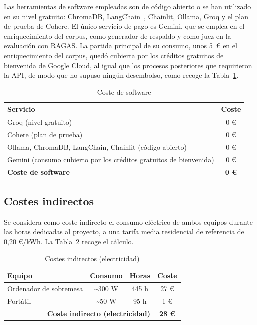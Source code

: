 \documentclass[11pt, a4paper]{report}
\begin{document}
	Las herramientas de software empleadas son de código abierto o se han utilizado en su nivel gratuito: ChromaDB, LangChain~\cite{langchain}, Chainlit, Ollama, Groq y el plan de prueba de Cohere. El único servicio de pago es Gemini, que se emplea en el enriquecimiento del corpus, como generador de respaldo y como juez en la evaluación con RAGAS. La partida principal de su consumo, unos 5~€ en el enriquecimiento del corpus, quedó cubierta por los créditos gratuitos de bienvenida de Google Cloud, al igual que los procesos posteriores que requirieron la API, de modo que no supuso ningún desembolso, como recoge la Tabla~\ref{tab:coste-software}.

	\begin{table}[H]
		\centering
		\begin{tabular}{|l|c|}
			\hline
			\rowcolor{tabla-header}
			\textbf{Servicio} & \textbf{Coste} \\
			\hline
			Groq (nivel gratuito) & 0 € \\
			\hline
			\rowcolor{fila-alterna}
			Cohere (plan de prueba) & 0 € \\
			\hline
			Ollama, ChromaDB, LangChain, Chainlit (código abierto) & 0 € \\
			\hline
			\rowcolor{fila-alterna}
			Gemini (consumo cubierto por los créditos gratuitos de bienvenida) & 0 € \\
			\hline
			\textbf{Coste de software} & \textbf{0 €} \\
			\hline
		\end{tabular}
		\caption{Coste de software}
		\label{tab:coste-software}
	\end{table}

	\subsection{Costes indirectos}

	Se considera como coste indirecto el consumo eléctrico de ambos equipos
	durante las horas dedicadas al proyecto, a una tarifa media residencial de
	referencia de 0,20 €/kWh. La Tabla~\ref{tab:coste-indirecto} recoge el cálculo.

	\begin{table}[H]
		\centering
		\begin{tabular}{|l|c|c|c|}
			\hline
			\rowcolor{tabla-header}
			\textbf{Equipo} & \textbf{Consumo} & \textbf{Horas} & \textbf{Coste} \\
			\hline
			Ordenador de sobremesa & \textasciitilde300 W & 445 h & 27 € \\
			\hline
			\rowcolor{fila-alterna}
			Portátil & \textasciitilde50 W & 95 h & 1 € \\
			\hline
			\multicolumn{3}{|r|}{\textbf{Coste indirecto (electricidad)}} & \textbf{28 €} \\
			\hline
		\end{tabular}
		\caption{Costes indirectos (electricidad)}
		\label{tab:coste-indirecto}
	\end{table}
\end{document}
